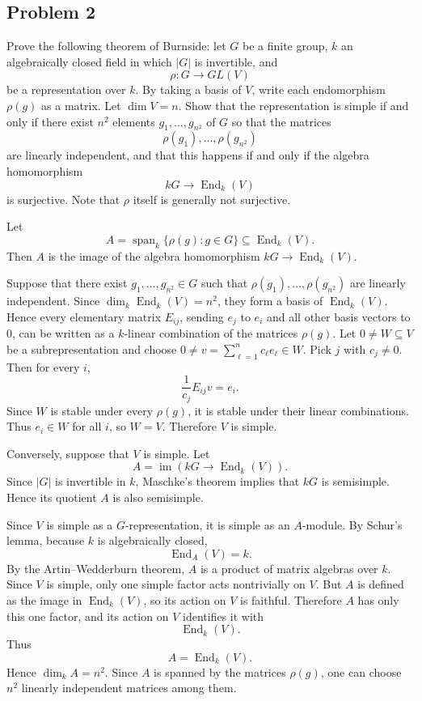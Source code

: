 \subsection*{Problem 2}

Prove the following theorem of Burnside: let \(G\) be a finite group, \(k\) an
algebraically closed field in which \(|G|\) is invertible, and
\[
\rho:G\to GL(V)
\]
be a representation over \(k\). By taking a basis of \(V\), write each
endomorphism \(\rho(g)\) as a matrix. Let \(\dim V=n\). Show that the
representation is simple if and only if there exist \(n^2\) elements
\(g_1,\dots,g_{n^2}\) of \(G\) so that the matrices
\[
\rho(g_1),\dots,\rho(g_{n^2})
\]
are linearly independent, and that this happens if and only if the algebra
homomorphism
\[
kG\to \operatorname{End}_k(V)
\]
is surjective. Note that \(\rho\) itself is generally not surjective.


\begin{solution}
    Let
\[
A=\operatorname{span}_k\{\rho(g):g\in G\}\subseteq \operatorname{End}_k(V).
\]
Then \(A\) is the image of the algebra homomorphism
$
kG\to \operatorname{End}_k(V).
$


Suppose that there exist \(g_1,\dots,g_{n^2}\in G\) such that
\(\rho(g_1),\dots,\rho(g_{n^2})\) are linearly independent. Since
\(\dim_k\operatorname{End}_k(V)=n^2\), they form a basis of
\(\operatorname{End}_k(V)\). Hence every elementary matrix \(E_{ij}\), sending
\(e_j\) to \(e_i\) and all other basis vectors to \(0\), can be written as a
\(k\)-linear combination of the matrices \(\rho(g)\).
Let \(0\neq W\subseteq V\) be a subrepresentation and choose
\(0\neq v=\sum_{\ell=1}^n c_\ell e_\ell\in W\). Pick \(j\) with \(c_j\neq 0\).
Then for every \(i\),
\[
\frac{1}{c_j}E_{ij}v=e_i.
\]
Since \(W\) is stable under every \(\rho(g)\), it is stable under their
linear combinations. Thus \(e_i\in W\) for all \(i\), so \(W=V\). Therefore
\(V\) is simple.


Conversely, suppose that \(V\) is simple. Let
\[
A=\operatorname{im}(kG\to \operatorname{End}_k(V)).
\]
Since \(|G|\) is invertible in \(k\), Maschke's theorem implies that \(kG\) is
semisimple. Hence its quotient \(A\) is also semisimple.

Since \(V\) is simple as a \(G\)-representation, it is simple as an
\(A\)-module. By Schur's lemma, because \(k\) is algebraically closed,
\[
\operatorname{End}_A(V)=k.
\]
By the Artin--Wedderburn theorem, \(A\) is a product of matrix algebras over
\(k\). Since \(V\) is simple, only one simple factor acts nontrivially on
\(V\). But \(A\) is defined as the image in \(\operatorname{End}_k(V)\), so its
action on \(V\) is faithful. Therefore \(A\) has only this one factor, and its
action on \(V\) identifies it with
\[
\operatorname{End}_k(V).
\]
Thus
\[
A=\operatorname{End}_k(V).
\]
Hence \(\dim_k A=n^2\). Since \(A\) is spanned by the matrices \(\rho(g)\), one
can choose \(n^2\) linearly independent matrices among them.
\end{solution}



